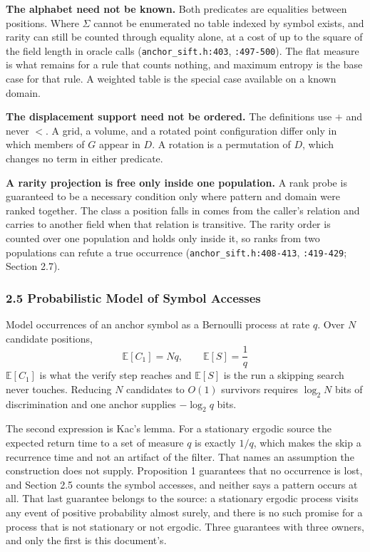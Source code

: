 \noindent\textbf{The alphabet need not be known.} Both predicates are equalities between positions. Where \(\Sigma\) cannot be enumerated no table indexed by symbol exists, and rarity can still be counted through equality alone, at a cost of up to the square of the field length in oracle calls (\texttt{anchor\_sift.h:403}, \texttt{:497-500}). The flat measure is what remains for a rule that counts nothing, and maximum entropy is the base case for that rule. A weighted table is the special case available on a known domain.

\noindent\textbf{The displacement support need not be ordered.} The definitions use \(+\) and never \(<\). A grid, a volume, and a rotated point configuration differ only in which members of \(G\) appear in \(D\). A rotation is a permutation of \(D\), which changes no term in either predicate.

\noindent\textbf{A rarity projection is free only inside one population.} A rank probe is guaranteed to be a necessary condition only where pattern and domain were ranked together. The class a position falls in comes from the caller's relation and carries to another field when that relation is transitive. The rarity order is counted over one population and holds only inside it, so ranks from two populations can refute a true occurrence (\texttt{anchor\_sift.h:408-413}, \texttt{:419-429}; Section 2.7).

\subsubsection{2.5 Probabilistic Model of Symbol Accesses}

Model occurrences of an anchor symbol as a Bernoulli process at rate \(q\). Over \(N\) candidate positions,
\[
  \mathbb{E}[C_1] = N q, \qquad \mathbb{E}[S] = \frac{1}{q}
\]
\(\mathbb{E}[C_1]\) is what the verify step reaches and \(\mathbb{E}[S]\) is the run a skipping search never touches. Reducing \(N\) candidates to \(O(1)\) survivors requires \(\log_2 N\) bits of discrimination and one anchor supplies \(-\log_2 q\) bits.

The second expression is Kac's lemma. For a stationary ergodic source the expected return time to a set of measure \(q\) is exactly \(1/q\), which makes the skip a recurrence time and not an artifact of the filter. That names an assumption the construction does not supply. Proposition 1 guarantees that no occurrence is lost, and Section 2.5 counts the symbol accesses, and neither says a pattern occurs at all. That last guarantee belongs to the source: a stationary ergodic process visits any event of positive probability almost surely, and there is no such promise for a process that is not stationary or not ergodic. Three guarantees with three owners, and only the first is this document's.

